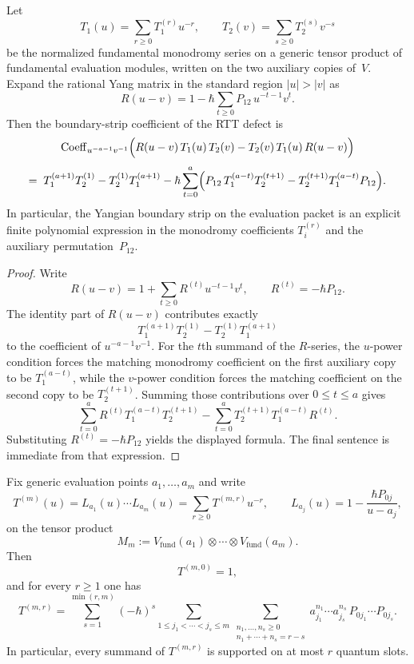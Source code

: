 \begin{proposition}
\label{prop:dg-shifted-rtt-boundary-coefficient-formula}
Let
\[
T_1(u)=\sum_{r\ge 0} T_1^{(r)}u^{-r},
\qquad
T_2(v)=\sum_{s\ge 0} T_2^{(s)}v^{-s}
\]
be the normalized fundamental monodromy series on a generic tensor
product of fundamental evaluation modules, written on the two auxiliary
copies of~$V$.  Expand the rational Yang matrix in the standard region
$|u|>|v|$ as
\[
R(u-v)=1-\hbar\sum_{t\ge 0} P_{12}\,u^{-t-1}v^t.
\]
Then the boundary-strip coefficient of the RTT defect is
\[
\operatorname{Coeff}_{u^{-a-1}v^{-1}}
\Bigl(
R(u-v)\,T_1(u)\,T_2(v)-T_2(v)\,T_1(u)\,R(u-v)
\Bigr)
\]
\[
=\;
T_1^{(a+1)}T_2^{(1)}-T_2^{(1)}T_1^{(a+1)}
-\hbar\sum_{t=0}^{a}
\Bigl(
P_{12}\,T_1^{(a-t)}T_2^{(t+1)}
-T_2^{(t+1)}T_1^{(a-t)}P_{12}
\Bigr).
\]
In particular, the Yangian boundary strip on the evaluation packet is
an explicit finite polynomial expression in the monodromy coefficients
$T_i^{(r)}$ and the auxiliary permutation~$P_{12}$.
\end{proposition}

\begin{proof}
Write
\[
R(u-v)=1+\sum_{t\ge0}R^{(t)}u^{-t-1}v^t,
\qquad
R^{(t)}=-\hbar P_{12}.
\]
The identity part of $R(u-v)$ contributes exactly
\[
T_1^{(a+1)}T_2^{(1)}-T_2^{(1)}T_1^{(a+1)}
\]
to the coefficient of $u^{-a-1}v^{-1}$.  For the $t$th summand of the
$R$-series, the $u$-power condition forces the matching monodromy
coefficient on the first auxiliary copy to be $T_1^{(a-t)}$, while the
$v$-power condition forces the matching coefficient on the second copy
to be $T_2^{(t+1)}$.  Summing those contributions over $0\le t\le a$
gives
\[
\sum_{t=0}^{a}R^{(t)}T_1^{(a-t)}T_2^{(t+1)}
-\sum_{t=0}^{a}T_2^{(t+1)}T_1^{(a-t)}R^{(t)}.
\]
Substituting $R^{(t)}=-\hbar P_{12}$ yields the displayed formula.
The final sentence is immediate from that expression.
\end{proof}

\begin{proposition}
\label{prop:dg-shifted-rtt-fundamental-coefficient-formula}
Fix generic evaluation points $a_1,\dots,a_m$ and write
\[
T^{(m)}(u)=L_{a_1}(u)\cdots L_{a_m}(u)
=\sum_{r\ge0}T^{(m,r)}u^{-r},
\qquad
L_{a_j}(u)=1-\frac{\hbar P_{0j}}{u-a_j},
\]
on the tensor product
\[
M_m:=V_{\mathrm{fund}}(a_1)\otimes\cdots\otimes
V_{\mathrm{fund}}(a_m).
\]
Then
\[
T^{(m,0)}=1,
\]
and for every $r\ge1$ one has
\[
T^{(m,r)}
=
\sum_{s=1}^{\min(r,m)}(-\hbar)^s
\sum_{1\le j_1<\cdots<j_s\le m}
\sum_{\substack{n_1,\dots,n_s\ge0\\ n_1+\cdots+n_s=r-s}}
a_{j_1}^{n_1}\cdots a_{j_s}^{n_s}\,
P_{0j_1}\cdots P_{0j_s}.
\]
In particular, every summand of $T^{(m,r)}$ is supported on at most
$r$ quantum slots.
\end{proposition}

